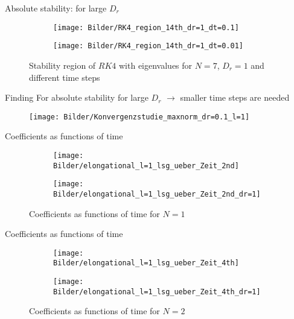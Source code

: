 \begin{frame}{Absolute stability: for large $D_r$}
	\begin{figure}
		\begin{subfigure}{0.48\textwidth}
			\texttt{[image: Bilder/RK4\_region\_14th\_dr=1\_dt=0.1]}
		\end{subfigure}
		\hfill
		\begin{subfigure}{0.48\textwidth}
			\texttt{[image: Bilder/RK4\_region\_14th\_dr=1\_dt=0.01]}
		\end{subfigure}
		\caption{Stability region of $RK4$ with eigenvalues for $N=7$, $D_r=1$ and different time steps}
	\end{figure}

	\begin{block}{Finding}
	For absolute stability for large $D_r$  $\rightarrow$ smaller time steps are needed
	\end{block}
\end{frame}



\begin{frame}
		\begin{figure}
			\texttt{[image: Bilder/Konvergenzstudie\_maxnorm\_dr=0.1\_l=1]}
		\end{figure}
\end{frame}

\begin{frame}{Coefficients as functions of time}
	\begin{figure}
		\begin{subfigure}{0.48\textwidth}
			\texttt{[image: Bilder/elongational\_l=1\_lsg\_ueber\_Zeit\_2nd]}
		\end{subfigure}
		\hfill
		\begin{subfigure}{0.48\textwidth}
			\texttt{[image: Bilder/elongational\_l=1\_lsg\_ueber\_Zeit\_2nd\_dr=1]}
		\end{subfigure}
		\caption{Coefficients as functions of time for $N=1$}
	\end{figure}
\end{frame}


\begin{frame}{Coefficients as functions of time}
	\begin{figure}
		\begin{subfigure}{0.48\textwidth}
			\texttt{[image: Bilder/elongational\_l=1\_lsg\_ueber\_Zeit\_4th]}
		\end{subfigure}
		\hfill
		\begin{subfigure}{0.48\textwidth}
			\texttt{[image: Bilder/elongational\_l=1\_lsg\_ueber\_Zeit\_4th\_dr=1]}
		\end{subfigure}
		\caption{Coefficients as functions of time for $N=2$}
	\end{figure}
\end{frame}

